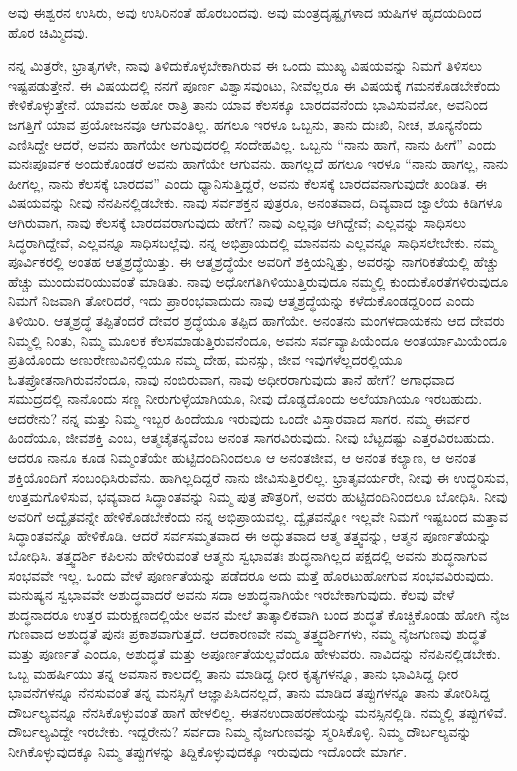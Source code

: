 ಅವು ಈಶ್ವರನ ಉಸಿರು, ಅವು ಉಸಿರಿನಂತೆ ಹೊರಬಂದವು. ಅವು ಮಂತ್ರದೃಷ್ಟೃಗಳಾದ ಋಷಿಗಳ ಹೃದಯದಿಂದ ಹೊರ ಚಿಮ್ಮಿದವು. 

ನನ್ನ ಮಿತ್ರರೇ, ಭ್ರಾತೃಗಳೇ, ನಾವು ತಿಳಿದುಕೊಳ್ಳಬೇಕಾಗಿರುವ ಈ ಒಂದು ಮುಖ್ಯ ವಿಷಯವನ್ನು ನಿಮಗೆ ತಿಳಿಸಲು ಇಷ್ಟಪಡುತ್ತೇನೆ. ಈ ವಿಷಯದಲ್ಲಿ ನನಗೆ ಪೂರ್ಣ ವಿಶ್ವಾಸವುಂಟು, ನೀವೆಲ್ಲರೂ ಈ ವಿಷಯಕ್ಕೆ ಗಮನಕೊಡಬೇಕೆಂದು ಕೇಳಿಕೊಳ್ಳುತ್ತೇನೆ. ಯಾವನು ಅಹೋ ರಾತ್ರಿ ತಾನು ಯಾವ ಕೆಲಸಕ್ಕೂ ಬಾರದವನೆಂದು ಭಾವಿಸುವನೋ, ಅವನಿಂದ ಜಗತ್ತಿಗೆ ಯಾವ ಪ್ರಯೋಜನವೂ ಆಗುವಂತಿಲ್ಲ. ಹಗಲೂ ಇರಳೂ ಒಬ್ಬನು, ತಾನು ದುಃಖಿ, ನೀಚ, ಶೂನ್ಯನೆಂದು ಎಣಿಸಿದ್ದೇ ಆದರೆ, ಅವನು ಹಾಗೆಯೇ ಅಗುವುದರಲ್ಲಿ ಸಂದೇಹವಿಲ್ಲ. ಒಬ್ಬನು “ನಾನು ಹಾಗೆ, ನಾನು ಹೀಗೆ” ಎಂದು ಮನಃಪೂರ್ವಕ ಅಂದುಕೊಂಡರೆ ಅವನು ಹಾಗೆಯೇ ಆಗುವನು. ಹಾಗಲ್ಲದೆ ಹಗಲೂ ಇರಳೂ “ನಾನು ಹಾಗಲ್ಲ, ನಾನು ಹೀಗಲ್ಲ, ನಾನು ಕೆಲಸಕ್ಕೆ ಬಾರದವ” ಎಂದು ಧ್ಯಾನಿಸುತ್ತಿದ್ದರೆ, ಅವನು ಕೆಲಸಕ್ಕೆ ಬಾರದವನಾಗುವುದೇ ಖಂಡಿತ. ಈ ವಿಷಯವನ್ನು ನೀವು ನೆನಪಿನಲ್ಲಿಡಬೇಕು. ನಾವು ಸರ್ವಶಕ್ತನ ಪುತ್ರರೂ, ಅನಂತವಾದ, ದಿವ್ಯವಾದ ಜ್ವಾಲೆಯ ಕಿಡಿಗಳೂ ಆಗಿರುವಾಗ, ನಾವು ಕೆಲಸಕ್ಕೆ ಬಾರದವರಾಗುವುದು ಹೇಗೆ? ನಾವು ಎಲ್ಲವೂ ಆಗಿದ್ದೇವೆ; ಎಲ್ಲವನ್ನು ಸಾಧಿಸಲು ಸಿದ್ಧರಾಗಿದ್ದೇವೆ, ಎಲ್ಲವನ್ನೂ ಸಾಧಿಸಬಲ್ಲೆವು. ನನ್ನ ಅಭಿಪ್ರಾಯದಲ್ಲಿ ಮಾನವನು ಎಲ್ಲವನ್ನೂ ಸಾಧಿಸಲೇಬೇಕು. ನಮ್ಮ ಪೂರ್ವಿಕರಲ್ಲಿ ಅಂತಹ ಆತ್ಮಶ್ರದ್ಧೆಯಿತ್ತು. ಈ ಆತ್ಮಶ್ರದ್ಧೆಯೇ ಅವರಿಗೆ ಶಕ್ತಿಯನ್ನಿತ್ತು, ಅವರನ್ನು ನಾಗರಿಕತೆಯಲ್ಲಿ ಹೆಚ್ಚು ಹೆಚ್ಚು ಮುಂದುವರಿಯುವಂತೆ ಮಾಡಿತು. ನಾವು ಅಧೋಗತಿಗಿಳಿಯುತ್ತಿರುವುದೂ ನಮ್ಮಲ್ಲಿ ಕುಂದುಕೊರತೆಗಳಿರುವುದೂ ನಿಮಗೆ ನಿಜವಾಗಿ ತೋರಿದರೆ, ಇದು ಪ್ರಾರಂಭವಾದುದು ನಾವು ಆತ್ಮಶ್ರದ್ಧೆಯನ್ನು ಕಳೆದುಕೊಂಡದ್ದರಿಂದ ಎಂದು ತಿಳಿಯಿರಿ. ಆತ್ಮಶ್ರದ್ಧೆ ತಪ್ಪಿತೆಂದರೆ ದೇವರ ಶ್ರದ್ಧೆಯೂ ತಪ್ಪಿದ ಹಾಗೆಯೇ. ಅನಂತನು ಮಂಗಳದಾಯಕನು ಆದ ದೇವರು ನಿಮ್ಮಲ್ಲಿ ನಿಂತು, ನಿಮ್ಮ ಮೂಲಕ ಕೆಲಸಮಾಡುತ್ತಿರುವನೆಂದೂ, ಅವನು ಸರ್ವವ್ಯಾಪಿಯೆಂದೂ ಅಂತರ್ಯಾಮಿಯೆಂದೂ ಪ್ರತಿಯೊಂದು ಅಣುರೇಣುವಿನಲ್ಲಿಯೂ ನಮ್ಮ ದೇಹ, ಮನಸ್ಸು, ಜೀವ ಇವುಗಳೆಲ್ಲದರಲ್ಲಿಯೂ ಓತಪ್ರೋತನಾಗಿರುವನೆಂದೂ, ನಾವು ನಂಬಿರುವಾಗ, ನಾವು ಅಧೀರರಾಗುವುದು ತಾನೆ ಹೇಗೆ? ಅಗಾಧವಾದ ಸಮುದ್ರದಲ್ಲಿ ನಾನೊಂದು ಸಣ್ಣ ನೀರುಗುಳ್ಳೆಯಾಗಿಯೂ, ನೀವು ದೊಡ್ಡದೊಂದು ಅಲೆಯಾಗಿಯೂ ಇರಬಹುದು. ಆದರೇನು? ನನ್ನ ಮತ್ತು ನಿಮ್ಮ ಇಬ್ಬರ ಹಿಂದೆಯೂ ಇರುವುದು ಒಂದೇ ವಿಸ್ತಾರವಾದ ಸಾಗರ. ನಮ್ಮ ಈರ್ವರ ಹಿಂದೆಯೂ, ಜೀವಶಕ್ತಿ ಎಂಬ, ಆತ್ಮಚೈತನ್ಯವೆಂಬ ಅನಂತ ಸಾಗರವಿರುವುದು. ನೀವು ಬೆಟ್ಟದಷ್ಟು ಎತ್ತರವಿರಬಹುದು. ಆದರೂ ನಾನೂ ಕೂಡ ನಿಮ್ಮಂತೆಯೇ ಹುಟ್ಟಿದಂದಿನಿಂದಲೂ ಆ ಅನಂತಜೀವ, ಆ ಅನಂತ ಕಲ್ಯಾಣ, ಆ ಅನಂತ ಶಕ್ತಿಯೊಂದಿಗೆ ಸಂಬಂಧಿಸಿರುವೆನು. ಹಾಗಿಲ್ಲದಿದ್ದರೆ ನಾನು ಜೀವಿಸುತ್ತಿರಲಿಲ್ಲ. ಭ್ರಾತೃವರ್ಯರೇ, ನೀವು ಈ ಉದ್ಧರಿಸುವ, ಉತ್ತಮಗೊಳಿಸುವ, ಭವ್ಯವಾದ ಸಿದ್ಧಾಂತವನ್ನು ನಿಮ್ಮ ಪುತ್ರ ಪೌತ್ರರಿಗೆ, ಅವರು ಹುಟ್ಟಿದಂದಿನಿಂದಲೂ ಬೋಧಿಸಿ. ನೀವು ಅವರಿಗೆ ಅದ್ವೈತವನ್ನೇ ಹೇಳಿಕೊಡಬೇಕೆಂದು ನನ್ನ ಅಭಿಪ್ರಾಯವಲ್ಲ. ದ್ವೈತವನ್ನೋ ಇಲ್ಲವೇ ನಿಮಗೆ ಇಷ್ಟಬಂದ ಮತ್ತಾವ ಸಿದ್ಧಾಂತವನ್ನೊ ಹೇಳಿಕೊಡಿ. ಆದರೆ ಸರ್ವಸಮ್ಮತವಾದ ಈ ಅದ್ಭುತವಾದ ಆತ್ಮ ತತ್ತ್ವವನ್ನು, ಆತ್ಮನ ಪೂರ್ಣತೆಯನ್ನು ಬೋಧಿಸಿ. ತತ್ತ್ವದರ್ಶಿ ಕಪಿಲನು ಹೇಳಿರುವಂತೆ ಆತ್ಮನು ಸ್ವಭಾವತಃ ಶುದ್ಧನಾಗಿಲ್ಲದ ಪಕ್ಷದಲ್ಲಿ ಅವನು ಶುದ್ಧನಾಗುವ ಸಂಭವವೇ ಇಲ್ಲ. ಒಂದು ವೇಳೆ ಪೂರ್ಣತೆಯನ್ನು ಪಡೆದರೂ ಅದು ಮತ್ತೆ ಹೊರಟುಹೋಗುವ ಸಂಭವವಿರುವುದು. ಮನುಷ್ಯನ ಸ್ವಭಾವವೇ ಅಶುದ್ಧವಾದರೆ ಅವನು ಸದಾ ಅಶುದ್ಧನಾಗಿಯೇ ಇರಬೇಕಾಗುವುದು. ಕೆಲವು ವೇಳೆ ಶುದ್ಧನಾದರೂ ಉತ್ತರ ಮರುಕ್ಷಣದಲ್ಲಿಯೇ ಅವನ ಮೇಲೆ ತಾತ್ಕಾಲಿಕವಾಗಿ ಬಂದ ಶುದ್ಧತೆ ಕೊಚ್ಚಿಕೊಂಡು ಹೋಗಿ ನೈಜ ಗುಣವಾದ ಅಶುದ್ಧತೆ ಪುನಃ ಪ್ರಕಾಶವಾಗುತ್ತದೆ. ಆದಕಾರಣವೇ ನಮ್ಮ ತತ್ತ್ವದರ್ಶಿಗಳು, ನಮ್ಮ ನೈಜಗುಣವು ಶುದ್ಧತೆ ಮತ್ತು ಪೂರ್ಣತೆ ಎಂದೂ, ಅಶುದ್ಧತೆ ಮತ್ತು ಅಪೂರ್ಣತೆಯಲ್ಲವೆಂದೂ ಹೇಳುವರು. ನಾವಿದನ್ನು ನೆನಪಿನಲ್ಲಿಡಬೇಕು. ಒಬ್ಬ ಮಹರ್ಷಿಯು ತನ್ನ ಅವಸಾನ ಕಾಲದಲ್ಲಿ ತಾನು ಮಾಡಿದ್ದ ಧೀರ ಕೃತ್ಯಗಳನ್ನೂ, ತಾನು ಭಾವಿಸಿದ್ದ ಧೀರ ಭಾವನೆಗಳನ್ನೂ ನೆನಸುವಂತೆ ತನ್ನ ಮನಸ್ಸಿಗೆ ಆಜ್ಞಾಪಿಸಿದನಲ್ಲದೆ, ತಾನು ಮಾಡಿದ ತಪ್ಪುಗಳನ್ನೂ ತಾನು ತೋರಿಸಿದ್ದ ದೌರ್ಬಲ್ಯವನ್ನೂ ನೆನಸಿಕೊಳ್ಳುವಂತೆ ಹಾಗೆ ಹೇಳಲಿಲ್ಲ. ಈತನ\break ಉದಾಹರಣೆಯನ್ನು ಮನಸ್ಸಿನಲ್ಲಿಡಿ. ನಮ್ಮಲ್ಲಿ ತಪ್ಪುಗಳಿವೆ. ದೌರ್ಬಲ್ಯವಿದ್ದೇ ಇರಬೇಕು. ಇದ್ದರೇನು? ಸರ್ವದಾ ನಿಮ್ಮ ನೈಜಗುಣವನ್ನು ಸ್ಮರಿಸಿಕೊಳ್ಳಿ. ನಿಮ್ಮ ದೌರ್ಬಲ್ಯವನ್ನು ನೀಗಿಕೊಳ್ಳುವುದಕ್ಕೂ ನಿಮ್ಮ ತಪ್ಪುಗಳನ್ನು ತಿದ್ದಿಕೊಳ್ಳುವುದಕ್ಕೂ ಇರುವುದು ಇದೊಂದೇ ಮಾರ್ಗ. 

